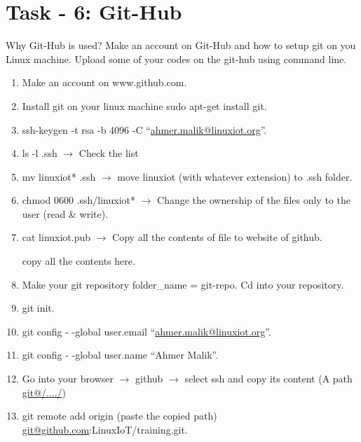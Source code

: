 \documentclass[letterpaper,10pt,english]{sphinxmanual}
\begin{document}
\section{Task - 6: Git-Hub}
\label{week-07:task-6-git-hub}
Why Git-Hub is used? Make an account on Git-Hub and how to setup git on you Linux machine. Upload some of your codes on the git-hub using command line.
\begin{enumerate}
\item {} 
Make an account on www.github.com.

\item {} 
Install git on your linux machine sudo apt-get install git.

\item {} 
ssh-keygen -t rsa -b 4096 -C “\href{mailto:ahmer.malik@linuxiot.org}{ahmer.malik@linuxiot.org}”.

\item {} 
ls -l .ssh              \(\rightarrow\)       Check the list

\item {} 
mv linuxiot* .ssh       \(\rightarrow\)       move linuxiot (with whatever extension) to .ssh folder.

\item {} 
chmod 0600 .ssh/linuxiot* \(\rightarrow\) Change the ownership of the files only to the user (read \& write).

\item {} 
cat linuxiot.pub \(\rightarrow\) Copy all the contents of file to website of github.

 copy all the contents here.

\item {} 
Make your git repository folder\_name = git-repo. Cd into your repository.

\item {} 
git init.

\item {} 
git config  - -global user.email “\href{mailto:ahmer.malik@linuxiot.org}{ahmer.malik@linuxiot.org}”.

\item {} 
git config  - -global user.name “Ahmer Malik”.

\item {} 
Go into your browser \(\rightarrow\) github \(\rightarrow\) select ssh and copy its content (A path \href{mailto:git@/..../}{git@/..../})

\item {} 
git remote add origin (paste the copied path) \href{mailto:git@github.com}{git@github.com}:LinuxIoT/training.git.


\end{enumerate}
\end{document}
